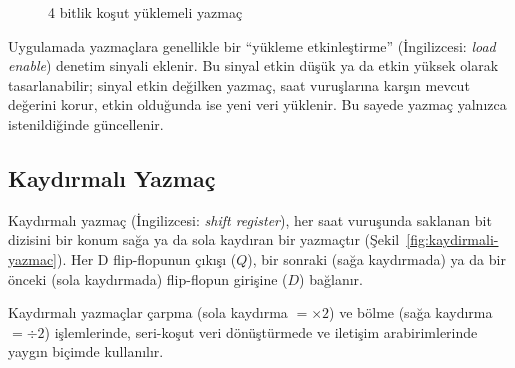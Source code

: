 \begin{figure}[H]
\centering
{}
\caption{4 bitlik koşut yüklemeli yazmaç}
\label{fig:kosut-yazmac}
\end{figure}

Uygulamada yazmaçlara genellikle bir ``yükleme etkinleştirme'' (İngilizcesi: \textit{load enable}) denetim sinyali eklenir. Bu sinyal etkin düşük ya da etkin yüksek olarak tasarlanabilir; sinyal etkin değilken yazmaç, saat vuruşlarına karşın mevcut değerini korur, etkin olduğunda ise yeni veri yüklenir. Bu sayede yazmaç yalnızca istenildiğinde güncellenir.

\subsection{Kaydırmalı Yazmaç}

Kaydırmalı yazmaç (İngilizcesi: \textit{shift register}), her saat vuruşunda saklanan bit dizisini bir konum sağa ya da sola kaydıran bir yazmaçtır (Şekil~\ref{fig:kaydirmali-yazmac}). Her D flip-flopunun çıkışı ($Q$), bir sonraki (sağa kaydırmada) ya da bir önceki (sola kaydırmada) flip-flopun girişine ($D$) bağlanır.

Kaydırmalı yazmaçlar çarpma (sola kaydırma $= \times 2$) ve bölme (sağa kaydırma $= \div 2$) işlemlerinde, seri-koşut veri dönüştürmede ve iletişim arabirimlerinde yaygın biçimde kullanılır.

